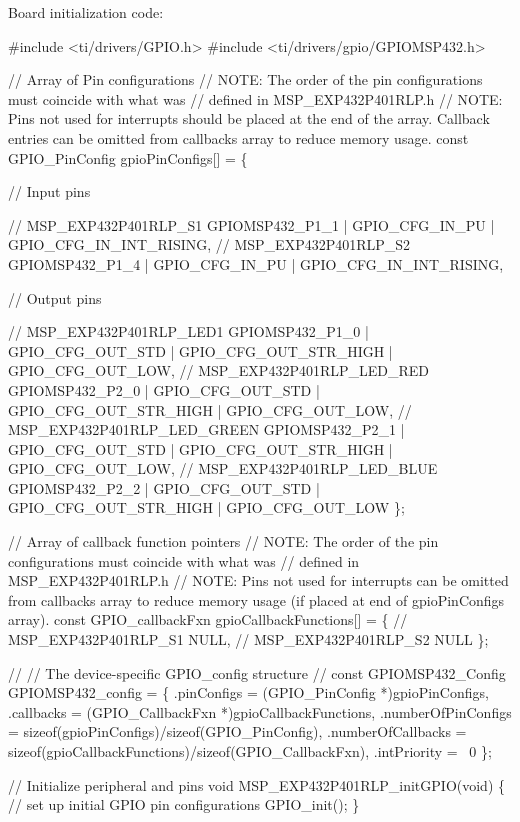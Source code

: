 Board initialization code\+: 
\begin{DoxyCode}
\textcolor{preprocessor}{#include <ti/drivers/GPIO.h>}
\textcolor{preprocessor}{#include <ti/drivers/gpio/GPIOMSP432.h>}

\textcolor{comment}{// Array of Pin configurations}
\textcolor{comment}{// NOTE: The order of the pin configurations must coincide with what was}
\textcolor{comment}{//       defined in MSP\_EXP432P401RLP.h}
\textcolor{comment}{// NOTE: Pins not used for interrupts should be placed at the end of the}
         array.  Callback entries can be omitted from callbacks array to
         reduce memory usage.
const GPIO_PinConfig gpioPinConfigs[] = \{

    \textcolor{comment}{// Input pins}

    \textcolor{comment}{// MSP\_EXP432P401RLP\_S1}
    GPIOMSP432_P1_1 | GPIO_CFG_IN_PU | GPIO_CFG_IN_INT_RISING,
    \textcolor{comment}{// MSP\_EXP432P401RLP\_S2}
    GPIOMSP432_P1_4 | GPIO_CFG_IN_PU | GPIO_CFG_IN_INT_RISING,

    \textcolor{comment}{// Output pins}

    \textcolor{comment}{// MSP\_EXP432P401RLP\_LED1}
    GPIOMSP432_P1_0 | GPIO_CFG_OUT_STD | GPIO_CFG_OUT_STR_HIGH | 
      GPIO_CFG_OUT_LOW,
    \textcolor{comment}{// MSP\_EXP432P401RLP\_LED\_RED}
    GPIOMSP432_P2_0 | GPIO_CFG_OUT_STD | GPIO_CFG_OUT_STR_HIGH | 
      GPIO_CFG_OUT_LOW,
    \textcolor{comment}{// MSP\_EXP432P401RLP\_LED\_GREEN}
    GPIOMSP432_P2_1 | GPIO_CFG_OUT_STD | GPIO_CFG_OUT_STR_HIGH | 
      GPIO_CFG_OUT_LOW,
    \textcolor{comment}{// MSP\_EXP432P401RLP\_LED\_BLUE}
    GPIOMSP432_P2_2 | GPIO_CFG_OUT_STD | GPIO_CFG_OUT_STR_HIGH | 
      GPIO_CFG_OUT_LOW
\};

\textcolor{comment}{// Array of callback function pointers}
\textcolor{comment}{// NOTE: The order of the pin configurations must coincide with what was}
\textcolor{comment}{//       defined in MSP\_EXP432P401RLP.h}
\textcolor{comment}{// NOTE: Pins not used for interrupts can be omitted from callbacks array to}
         reduce memory usage (\textcolor{keywordflow}{if} placed at end of gpioPinConfigs array).
const GPIO\_callbackFxn gpioCallbackFunctions[] = \{
    \textcolor{comment}{// MSP\_EXP432P401RLP\_S1}
    NULL,
    \textcolor{comment}{// MSP\_EXP432P401RLP\_S2}
    NULL
\};

\textcolor{comment}{//}
\textcolor{comment}{// The device-specific GPIO\_config structure}
\textcolor{comment}{//}
\textcolor{keyword}{const} GPIOMSP432_Config GPIOMSP432\_config = \{
    .pinConfigs = (GPIO_PinConfig *)gpioPinConfigs,
    .callbacks = (GPIO_CallbackFxn *)gpioCallbackFunctions,
    .numberOfPinConfigs =
             \textcolor{keyword}{sizeof}(gpioPinConfigs)/\textcolor{keyword}{sizeof}(GPIO_PinConfig),
    .numberOfCallbacks =
             \textcolor{keyword}{sizeof}(gpioCallbackFunctions)/\textcolor{keyword}{sizeof}(GPIO_CallbackFxn),
    .intPriority = ~0
\};

\textcolor{comment}{// Initialize peripheral and pins}
\textcolor{keywordtype}{void} MSP\_EXP432P401RLP\_initGPIO(\textcolor{keywordtype}{void})
\{
    \textcolor{comment}{// set up initial GPIO pin configurations}
    GPIO_init();
\}
\end{DoxyCode}


